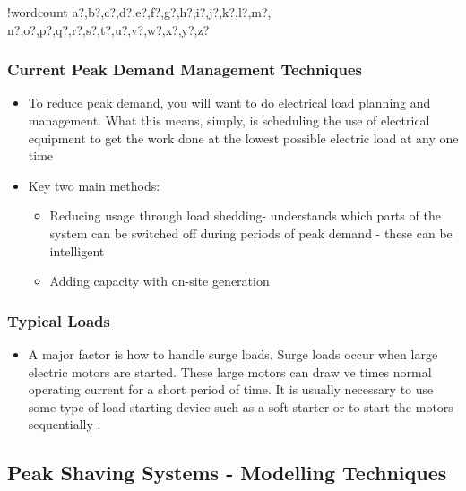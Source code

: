 \documentclass[10pt]{article}
\providecommand{\tightlist}{%
  \setlength{\itemsep}{0pt}\setlength{\parskip}{0pt}}
\newcounter{words}
\newenvironment{counted}{%
  \setcounter{words}{0}
  \SearchList!{wordcount}{\stepcounter{words}}
    {a?,b?,c?,d?,e?,f?,g?,h?,i?,j?,k?,l?,m?,
    n?,o?,p?,q?,r?,s?,t?,u?,v?,w?,x?,y?,z?}
  \UndoBoundary{'}
  \SearchOrder{p;}}{%
  \StopSearching}
\begin{document}
\begin{counted}
\subsubsection{Current Peak Demand Management
Techniques}\label{current-peak-demand-management-techniques}

\begin{itemize}
\tightlist
\item
  To reduce peak demand, you will want to do electrical load planning
  and management. What this means, simply, is scheduling the use of
  electrical equipment to get the work done at the lowest possible
  electric load at any one time \cite{Reducing37:online}
\item
  Key two main methods:

  \begin{itemize}
  \tightlist
  \item
    Reducing usage through load shedding- understands which parts of the
    system can be switched off during periods of peak demand - these can
    be intelligent \cite{6199851}
  \item
    Adding capacity with on-site generation \cite{schneiderRECPS}
  \end{itemize}
\end{itemize}

\subsubsection{Typical Loads}\label{typical-loads}

\begin{itemize}
\tightlist
\item
  A major factor is how to handle surge loads. Surge loads occur when
  large electric motors are started. These large motors can draw ve
  times normal operating current for a short period of time. It is
  usually necessary to use some type of load starting device such as a
  soft starter or to start the motors sequentially \cite{baldorPS}.
\end{itemize}

\subsection{Peak Shaving Systems - Modelling
Techniques}\label{peak-shaving-systems---modelling-techniques}


\end{counted}
\end{document}
